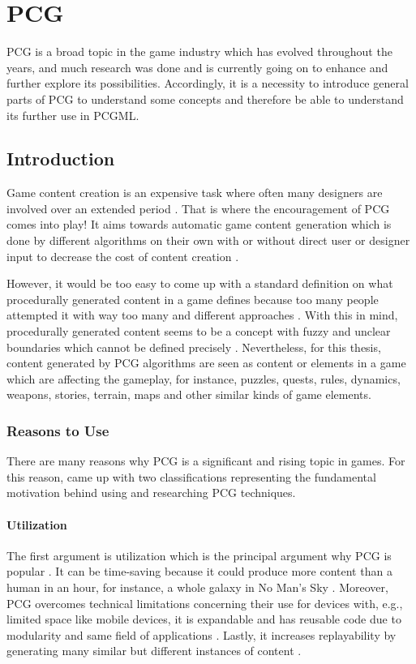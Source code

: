 \documentclass[MGS,Master,english]{twbook}%
\begin{document}
%
%
\clearpage
\chapter{\acl{PCG}}
\ac{PCG} is a broad topic in the game industry which has evolved throughout the years, and much research was done and is currently going on to enhance and further explore its possibilities. Accordingly, it is a necessity to introduce general parts of PCG to understand some concepts and therefore be able to understand its further use in PCGML.

\section{Introduction}
Game content creation is an expensive task where often many designers are involved over an extended period \cite{pcg::PCGinGameIndustry}. That is where the encouragement of \ac{PCG} comes into play! It aims towards automatic game content generation which is done by different algorithms on their own with or without direct user or designer input to decrease the cost of content creation \cite{pcg::PCGinGameIndustry} \cite{pcg::whatIsPCG}.

However, it would be too easy to come up with a standard definition on what procedurally generated content in a game defines because too many people attempted it with way too many and different approaches \cite{pcg::whatIsPCG}. With this in mind, procedurally generated content seems to be a concept with fuzzy and unclear boundaries which cannot be defined precisely \cite{pcg::whatIsPCG}. Nevertheless, for this thesis, content generated by PCG algorithms are seen as content or elements in a game which are affecting the gameplay, for instance, puzzles, quests, rules, dynamics, weapons, stories, terrain, maps and other similar kinds of game elements.

\subsection{Reasons to Use}
There are many reasons why PCG is a significant and rising topic in games. For this reason, \citep{pcg::inGameDesign} came up with two classifications representing the fundamental motivation behind using and researching PCG techniques.

\subsubsection{Utilization}
The first argument is utilization which is the principal argument why PCG is popular \cite{pcg::inGameDesign}. It can be time-saving because it could produce more content than a human in an hour, for instance, a whole galaxy in No Man’s Sky \cite{game::noMansSky} \cite{pcg::inGameDesign}. Moreover, PCG overcomes technical limitations concerning their use for devices with, e.g., limited space like mobile devices, it is expandable and has reusable code due to modularity and same field of applications \cite{pcg::inGameDesign}. Lastly, it increases replayability by generating many similar but different instances of content \cite{pcg::inGameDesign}.
\end{document}
